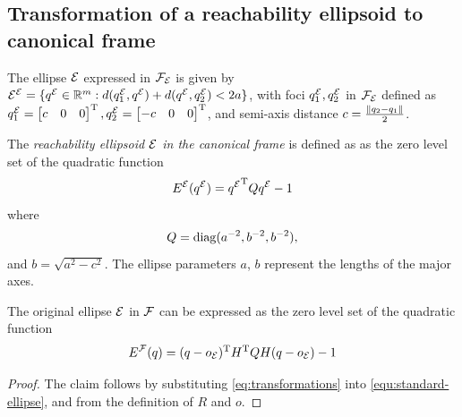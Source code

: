 \documentclass[10pt,twocolumn,twoside]{IEEEtran}
\newcommand{\news}{\color{blue}}
\begin{document}

\appendix
{\news
\subsection{Transformation of a reachability ellipsoid to canonical frame}\label{apx:transformation}
The ellipse $\mathcal{E}$ expressed in $\mathcal{F}_{\mathcal{E}}$ is given by ${\mathcal{E}^{\mathcal{E}}}=\{{q^{\mathcal{E}}}\in\mathbb{R}^{m}{}:d(q^{\mathcal{E}}_1,{q^{\mathcal{E}}})+d({q^{\mathcal{E}}},q^{\mathcal{E}}_2)<2a\}$, with foci $q^{\mathcal{E}}_1,q^{\mathcal{E}}_2$ in $\mathcal{F}_{\mathcal{E}}$ defined as
$q^{\mathcal{E}}_1=\begin{bmatrix}c & 0 & 0\end{bmatrix}^\mathrm{T}, q^{\mathcal{E}}_2=\begin{bmatrix}-c & 0 & 0\end{bmatrix}^\mathrm{T}$, and semi-axis distance $c=\frac{\lVert q_2-q_1\rVert}{2}$.
\begin{definition}
  The \emph{reachability ellipsoid $\mathcal{E}$ in the canonical frame} is defined as as the zero level set of the quadratic function
  \begin{equation}\label{equ:standard-ellipse}
    {E^{\mathcal{E}}}({q^{\mathcal{E}}}) = {q^{\mathcal{E}}}^\mathrm{T} Q {q^{\mathcal{E}}} - 1
  \end{equation}
  where
  \begin{equation}
    Q = \operatorname{diag}(a^{-2},b^{-2},b^{-2}),
  \end{equation}
  and $b = \sqrt{a^2-c^2}$.
  The ellipse parameters $a$, $b$ represent the lengths of the major axes.
\end{definition}
\begin{lemma}
The original ellipse $\mathcal{E}$ in $\mathcal{F}$ can be expressed as the zero level set of the quadratic function
   \begin{equation}\label{eq:ellpsoid from canonical}
     {E^{\mathcal{F}}}(q) = (q-o_{\mathcal{E}})^\mathrm{T} H^\mathrm{T} Q H (q-o_{\mathcal{E}}) - 1
     \end{equation}
\end{lemma}
\begin{proof}
    The claim follows by substituting  \eqref{eq:transformations} into \eqref{equ:standard-ellipse}, and from the definition of $R$ and $o$.
\end{proof}
}
\end{document}
